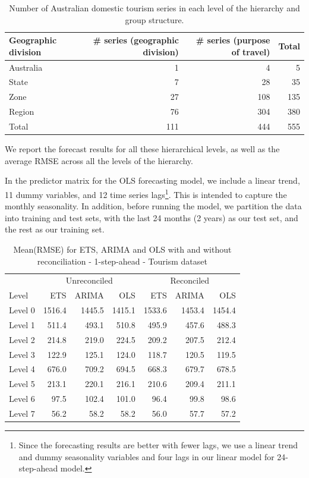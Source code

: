 \documentclass[11pt,a4paper,]{article}
\begin{document}
\begin{table}[!h]

\caption{\label{tab:Australiageographicalpurposedivision}Number of Australian domestic tourism series in each level of the hierarchy and group structure.}
\centering
\begin{tabular}{lrrr}
\toprule
Geographic division & \# series (geographic division) & \# series (purpose of travel) & Total\\
\midrule
Australia & 1 & 4 & 5\\
State & 7 & 28 & 35\\
Zone & 27 & 108 & 135\\
Region & 76 & 304 & 380\\
Total & 111 & 444 & 555\\
\bottomrule
\end{tabular}
\end{table}

We report the forecast results for all these hierarchical levels, as
well as the average RMSE across all the levels of the hierarchy.

In the predictor matrix for the OLS forecasting model, we include a
linear trend, 11 dummy variables, and 12 time series lags\footnote{Since
  the forecasting results are better with fewer lags, we use a linear
  trend and dummy seasonality variables and four lags in our linear
  model for 24-step-ahead model.}. This is intended to capture the
monthly seasonality. In addition, before running the model, we partition
the data into training and test sets, with the last 24 months (2 years)
as our test set, and the rest as our training set.


\begin{table}[!h]

\caption{\label{tab:Tourismdataresulrolling}Mean(RMSE) for ETS, ARIMA and OLS with and without reconciliation - 1-step-ahead - Tourism dataset}
\centering
\begin{tabular}{lrrrrrr}
\toprule
\multicolumn{1}{c}{} & \multicolumn{3}{c}{Unreconciled} & \multicolumn{3}{c}{Reconciled} \\
\cmidrule(l{2pt}r{2pt}){2-4} \cmidrule(l{2pt}r{2pt}){5-7}
Level & ETS & ARIMA & OLS & ETS & ARIMA & OLS\\
\midrule
Level 0 & 1516.4 & 1445.5 & 1415.1 & 1533.6 & 1453.4 & 1454.4\\
Level 1 & 511.4 & 493.1 & 510.8 & 495.9 & 457.6 & 488.3\\
Level 2 & 214.8 & 219.0 & 224.5 & 209.2 & 207.5 & 212.4\\
Level 3 & 122.9 & 125.1 & 124.0 & 118.7 & 120.5 & 119.5\\
Level 4 & 676.0 & 709.2 & 694.5 & 668.3 & 679.7 & 678.5\\
Level 5 & 213.1 & 220.1 & 216.1 & 210.6 & 209.4 & 211.1\\
Level 6 & 97.5 & 102.4 & 101.0 & 96.4 & 99.8 & 98.6\\
Level 7 & 56.2 & 58.2 & 58.2 & 56.0 & 57.7 & 57.2\\
\bottomrule
\end{tabular}
\end{table}
\end{document}
